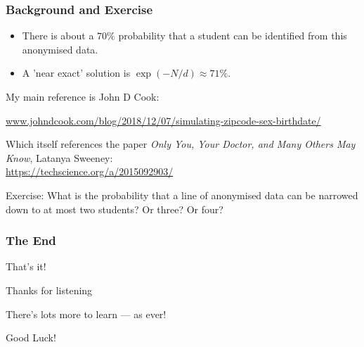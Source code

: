 \documentclass[dvips, %
               xcolor=pst,
               hyperref={colorlinks=false,
               dvips,
               citecolor=magenta,menucolor=cyan,
               bookmarks,bookmarksopen,pdfpagemode=UseThumbs}
              ]{beamer}
\renewcommand{\red}{}
\begin{document}
\begin{frame}[fragile]\frametitle{Background and Exercise}

\begin{itemize}[<+->]

\item There is about a $70\%$ probability that a student can be identified from
this anonymised data.

\item A 'near exact' solution is $\exp(-N/d) \approx 71\%$.

\end{itemize}


My main reference is John D Cook:

\bigskip\pause
{\footnotesize
\url{www.johndcook.com/blog/2018/12/07/simulating-zipcode-sex-birthdate/}}

\bigskip\pause
Which itself references the paper {\red \textit{Only You, Your Doctor, and Many Others May Know},
Latanya Sweeney}:\\
\url{https://techscience.org/a/2015092903/}

\bigskip\pause
\alert{Exercise:} What is the probability that a line of anonymised data can be narrowed down
to at most two students? Or three? Or four?


\end{frame}

\begin{frame}[fragile]\frametitle{The End}

That's it!

\bigskip
Thanks for listening

\bigskip
There's lots more to learn --- as ever!

\bigskip
Good Luck!

\end{frame}
\end{document}
